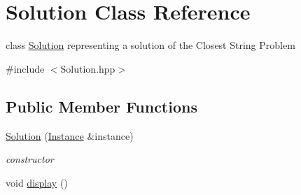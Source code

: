 \hypertarget{classSolution}{}\section{Solution Class Reference}
\label{classSolution}


class \hyperlink{classSolution}{Solution} representing a solution of the Closest String Problem  




{\ttfamily \#include $<$Solution.\+hpp$>$}

\subsection*{Public Member Functions}
\begin{DoxyCompactItemize}
\item 
\hyperlink{classSolution_a92768be65a979c8b7d827f97c69828ea}{Solution} (\hyperlink{classInstance}{Instance} \&instance)
\begin{DoxyCompactList}\small\item\em constructor \end{DoxyCompactList}\item 
void \hyperlink{classSolution_aa16aebd11ba7fbb4e12b3f9c33b06449}{display} ()\hypertarget{classSolution_aa16aebd11ba7fbb4e12b3f9c33b06449}{}\label{classSolution_aa16aebd11ba7fbb4e12b3f9c33b06449}


\end{DoxyCompactItemize}
